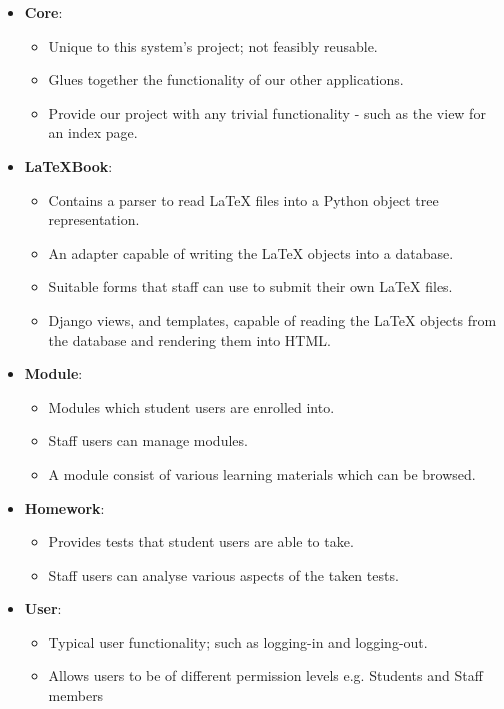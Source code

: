 		\begin{itemize}
			\item \textbf{Core}:
				\begin{itemize}
					\item Unique to this system's project; not feasibly reusable.
					\item Glues together the functionality of our other applications.
					\item Provide our project with any trivial functionality - such as the view for an index page.
				\end{itemize}

			\item \textbf{LaTeXBook}:
				\begin{itemize}
					\item Contains a parser to read LaTeX files into a Python object tree representation.
					\item An adapter capable of writing the LaTeX objects into a database.
					\item Suitable forms that staff can use to submit their own LaTeX files.
					\item Django views, and templates, capable of reading the LaTeX objects from the database and rendering them into HTML.
				\end{itemize}
				
			\item \textbf{Module}:
				\begin{itemize}
					\item Modules which student users are enrolled into.
					\item Staff users can manage modules.
					\item A module consist of various learning materials which can be browsed.
				\end{itemize} 

			\item \textbf{Homework}:
				\begin{itemize}
					\item Provides tests that student users are able to take.
					\item Staff users can analyse various aspects of the taken tests.
				\end{itemize}
			
			\item \textbf{User}:
			\begin{itemize}
				\item Typical user functionality; such as logging-in and logging-out.
				\item Allows users to be of different permission levels e.g. Students and Staff members
			\end{itemize} 
			
		\end{itemize}


